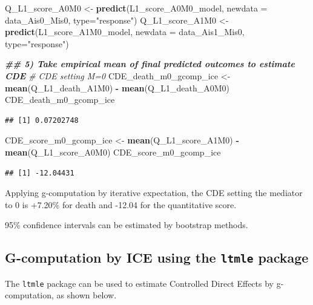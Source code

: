 \documentclass[
]{book}
\newenvironment{Shaded}{\begin{snugshade}}{\end{snugshade}}
\newcommand{\AttributeTok}[1]{\textcolor[rgb]{0.13,0.29,0.53}{#1}}
\newcommand{\CommentTok}[1]{\textcolor[rgb]{0.56,0.35,0.01}{\textit{#1}}}
\newcommand{\DocumentationTok}[1]{\textcolor[rgb]{0.56,0.35,0.01}{\textbf{\textit{#1}}}}
\newcommand{\FunctionTok}[1]{\textcolor[rgb]{0.13,0.29,0.53}{\textbf{#1}}}
\newcommand{\NormalTok}[1]{#1}
\newcommand{\OtherTok}[1]{\textcolor[rgb]{0.56,0.35,0.01}{#1}}
\newcommand{\SpecialCharTok}[1]{\textcolor[rgb]{0.81,0.36,0.00}{\textbf{#1}}}
\newcommand{\StringTok}[1]{\textcolor[rgb]{0.31,0.60,0.02}{#1}}
\begin{document}
\begin{Shaded}
\begin{Highlighting}[]
\NormalTok{Q\_L1\_score\_A0M0 }\OtherTok{\textless{}{-}} \FunctionTok{predict}\NormalTok{(L1\_score\_A0M0\_model, }
                           \AttributeTok{newdata =}\NormalTok{ data\_Ais0\_Mis0, }\AttributeTok{type=}\StringTok{"response"}\NormalTok{)}
\NormalTok{Q\_L1\_score\_A1M0 }\OtherTok{\textless{}{-}} \FunctionTok{predict}\NormalTok{(L1\_score\_A1M0\_model, }
                           \AttributeTok{newdata =}\NormalTok{ data\_Ais1\_Mis0, }\AttributeTok{type=}\StringTok{"response"}\NormalTok{)}

\DocumentationTok{\#\# 5) Take empirical mean of final predicted outcomes to estimate CDE}
\CommentTok{\# CDE setting M=0}
\NormalTok{CDE\_death\_m0\_gcomp\_ice }\OtherTok{\textless{}{-}} \FunctionTok{mean}\NormalTok{(Q\_L1\_death\_A1M0) }\SpecialCharTok{{-}} \FunctionTok{mean}\NormalTok{(Q\_L1\_death\_A0M0)}
\NormalTok{CDE\_death\_m0\_gcomp\_ice}
\end{Highlighting}
\end{Shaded}

\begin{verbatim}
## [1] 0.07202748
\end{verbatim}

\begin{Shaded}
\begin{Highlighting}[]
\NormalTok{CDE\_score\_m0\_gcomp\_ice }\OtherTok{\textless{}{-}} \FunctionTok{mean}\NormalTok{(Q\_L1\_score\_A1M0) }\SpecialCharTok{{-}} \FunctionTok{mean}\NormalTok{(Q\_L1\_score\_A0M0)}
\NormalTok{CDE\_score\_m0\_gcomp\_ice}
\end{Highlighting}
\end{Shaded}

\begin{verbatim}
## [1] -12.04431
\end{verbatim}

Applying g-computation by iterative expectation, the CDE setting the mediator to 0 is +7.20\% for death and -12.04 for the quantitative score.

95\% confidence intervals can be estimated by bootstrap methods.

\subsection{\texorpdfstring{G-computation by ICE using the \texttt{ltmle} package}{G-computation by ICE using the ltmle package}}\label{g-computation-by-ice-using-the-ltmle-package}

The \texttt{ltmle} package can be used to estimate Controlled Direct Effects by g-computation, as shown below.
\end{document}
